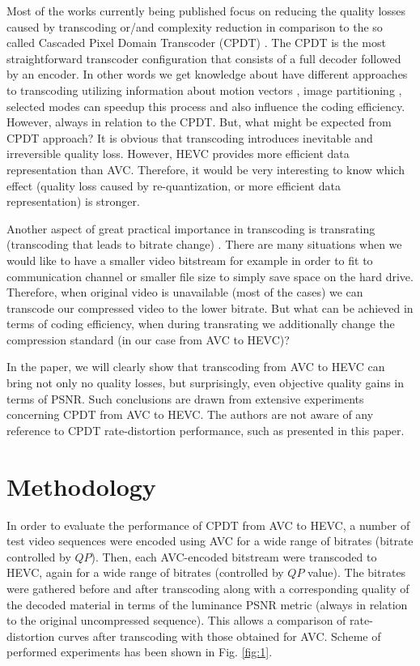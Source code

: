 \documentclass[twocolumn]{svjour3}          %
\begin{document}
Most of the works currently being published focus on reducing the quality losses caused by transcoding or/and complexity reduction \cite{Ref:7,Ref:8,Ref:9,Ref:10,Ref:11,Ref:12} in comparison to the so called Cascaded Pixel Domain Transcoder (CPDT) \cite{Ref:3}. The CPDT is the most straightforward transcoder configuration that consists of a full decoder followed by an encoder. In other words we get knowledge about have different approaches to transcoding utilizing information about motion vectors \cite{Ref:9,Ref:11,Ref:13}, image partitioning \cite{Ref:9,Ref:10}, selected modes \cite{Ref:10} can speedup this process and also influence the coding efficiency. However, always in relation to the CPDT. But, what might be expected from CPDT approach? It is obvious that transcoding introduces inevitable and irreversible quality loss. However, HEVC provides more efficient data representation than AVC. Therefore, it would be very interesting to know which effect (quality loss caused by re-quantization, or more efficient data representation) is stronger.

Another aspect of great practical importance in transcoding is transrating (transcoding that leads to bitrate change) \cite{Ref:7,Ref:9,Ref:12,Ref:13}. There are many situations when we would like to have a smaller video bitstream for example in order to fit to communication channel or smaller file size to simply save space on the hard drive. Therefore, when original video is unavailable (most of the cases) we can transcode our compressed video to the lower bitrate. But what can be achieved in terms of coding efficiency, when during transrating we additionally change the compression standard (in our case from AVC to HEVC)?
 
In the paper, we will clearly show that transcoding from AVC to HEVC can bring not only no quality losses, but surprisingly, even objective quality gains in terms of PSNR. Such conclusions are drawn from extensive experiments concerning CPDT from AVC to HEVC. The authors are not aware of any reference to CPDT rate-distortion performance, such as presented in this paper.


\section{Methodology}
\label{sec:1}
In order to evaluate the performance of CPDT from AVC to HEVC, a number of test video sequences were encoded using AVC for a wide range of bitrates (bitrate controlled by $QP$). Then, each AVC-encoded bitstream were transcoded to HEVC, again for a wide range of bitrates (controlled by $QP$ value). The bitrates were gathered before and after transcoding along with a corresponding quality of the decoded material in terms of the luminance PSNR metric (always in relation to the original uncompressed sequence). This allows a comparison of rate-distortion curves after transcoding with those obtained for AVC. Scheme of performed experiments has been shown in Fig. \ref{fig:1}.
\end{document}
